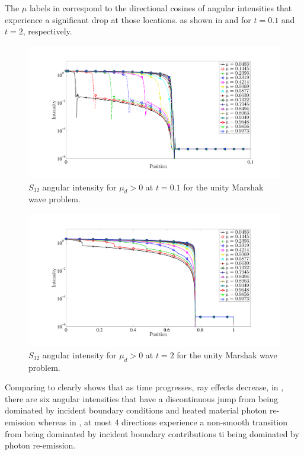 The $\mu$ labels in  correspond to the directional cosines of angular intensities that experience a significant drop at those locations.
 as shown in  and  for $t=0.1$ and $t=2$, respectively.
\begin{figure}[!htp]
\centering
\includegraphics[width=16cm,trim=2in  0.5in 0.5in 0.75in,clip=true]{chapter6_grey_radtran/Dissertation_Data/S32_T01_Intensity.pdf}
\caption{$S_{32}$ angular intensity for $\mu_d>0$ at $t=0.1$ for the unity Marshak wave problem.}
\label{fig:t01_intensity}
\end{figure}
\begin{figure}[!hbp]
\centering
\includegraphics[width=16cm,trim=2in  0.4in 0.5in 0.75in,clip=true]{chapter6_grey_radtran/Dissertation_Data/S32_T2_Intensity.pdf}
\caption{$S_{32}$ angular intensity for $\mu_d>0$ at $t=2$ for the unity Marshak wave problem.}
\label{fig:t2_intensity}
\end{figure}
Comparing  to  clearly shows that as time progresses, ray effects decrease, in , there are six angular intensities that have a discontinuous jump from being dominated by incident boundary conditions and heated material photon re-emission whereas in , at most 4 directions experience a non-smooth transition from being dominated by incident boundary contributions ti being dominated by photon re-emission.

